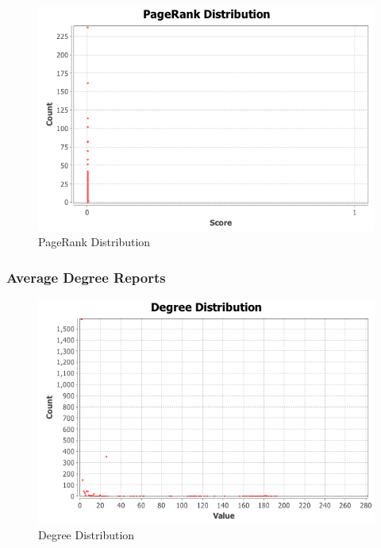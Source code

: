 \documentclass{article}
\begin{document}
\begin{figure}[H]
\centering
\includegraphics[scale=0.70]{q3/PageRankReport/pageranks}
\caption{PageRank Distribution}
\label{pageranks}
\end{figure}

\subsubsection*{Average Degree Reports}

\begin{figure}[H]
\centering
\includegraphics[scale=0.70]{q3/AverageDegreeReport/degree-distribution}
\caption{Degree Distribution}
\label{degreedistribution}
\end{figure}
\end{document}

